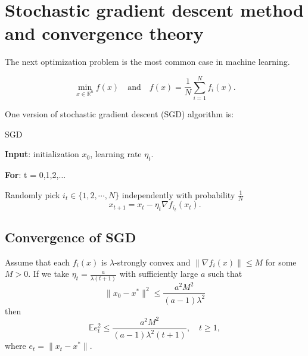 \section{Stochastic gradient descent method and convergence theory}
The next optimization problem is the most common case in machine learning.
\begin{problem}
	\begin{equation}\label{SGDproblem}	
 	\min_{x \in \mathbb{R}^n} f(x)\quad \mbox{and}\quad f(x) = \frac{1}{N} \sum_{i=1}^N f_i(x).
	\end{equation}
\end{problem}
One version of stochastic gradient descent (SGD) algorithm is:
\begin{algorithm}\caption{SGD}
\label{alg:SGD}
{\bf Input}: initialization $x_0$, learning rate $\eta_t$.

{\bf For}: t = 0,1,2,$\dots$ 

Randomly pick $i_t \in \{1, 2, \cdots, N\}$ independently with probability $\frac{1}{N}$
\begin{equation}\label{equ:sgd-iteration}
x_{t+1} = x_{t} - \eta_t \nabla f_{i_t}(x_t).
\end{equation}
\end{algorithm}


\subsection{Convergence of SGD}
\begin{theorem}Assume that each $f_i(x)$ is $\lambda$-strongly convex and $\|\nabla f_i(x)\| \le M$ for some $M >0$.
	If we take $\eta_t = \frac{a}{\lambda (t+1)}$ with sufficiently large $a$ such that 
	\begin{equation}\label{key}
	\|x_0 - x^*\|^2 \le \frac{a^2M^2}{(a-1)\lambda^2}
	\end{equation}
then 
\begin{equation}
\mathbb{E}e_{t}^2 \le \frac{a^2M^2}{(a-1)\lambda^2 (t+1)}, \quad  t\ge 1,
\end{equation}
where $e_t = \|x_t - x^*\|$.
\end{theorem}

